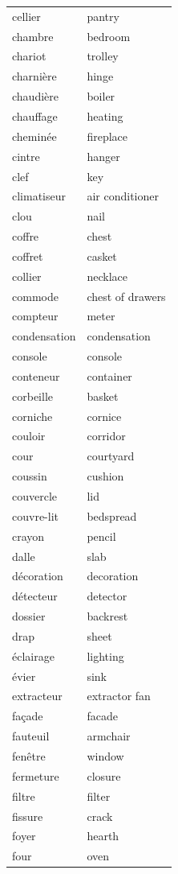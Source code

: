 \documentclass[12pt,a4paper]{article}
\begin{document}
\begin{longtable}{p{4cm} p{6cm}}
cellier & pantry \\
chambre & bedroom \\
chariot & trolley \\
charnière & hinge \\
chaudière & boiler \\
chauffage & heating \\
cheminée & fireplace \\
cintre & hanger \\
clef & key \\
climatiseur & air conditioner \\
clou & nail \\
coffre & chest \\
coffret & casket \\
collier & necklace \\
commode & chest of drawers \\
compteur & meter \\
condensation & condensation \\
console & console \\
conteneur & container \\
corbeille & basket \\
corniche & cornice \\
couloir & corridor \\
cour & courtyard \\
coussin & cushion \\
couvercle & lid \\
couvre-lit & bedspread \\
crayon & pencil \\
dalle & slab \\
décoration & decoration \\
détecteur & detector \\
dossier & backrest \\
drap & sheet \\
éclairage & lighting \\
évier & sink \\
extracteur & extractor fan \\
façade & facade \\
fauteuil & armchair \\
fenêtre & window \\
fermeture & closure \\
filtre & filter \\
fissure & crack \\
foyer & hearth \\
four & oven \\

\end{longtable}
\end{document}
